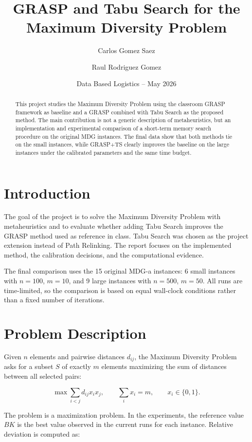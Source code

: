 \documentclass[12pt,a4paper]{article}
\title{\textbf{GRASP and Tabu Search for the Maximum Diversity Problem}}
\author{Carlos Gomez Saez \and Raul Rodriguez Gomez}
\date{Data Based Logistics -- May 2026}
\newcommand{\mdp}{Maximum Diversity Problem}
\newcommand{\grasp}{GRASP}
\newcommand{\graspTS}{GRASP+TS}
\newcommand{\tabu}{Tabu Search}
\begin{document}
\maketitle

\begin{abstract}
This project studies the \mdp{} using the classroom \grasp{} framework as baseline and a \grasp{} combined with \tabu{} as the proposed method. The main contribution is not a generic description of metaheuristics, but an implementation and experimental comparison of a short-term memory search procedure on the original MDG instances. The final data show that both methods tie on the small instances, while \graspTS{} clearly improves the baseline on the large instances under the calibrated parameters and the same time budget.
\end{abstract}

\section{Introduction}

The goal of the project is to solve the \mdp{} with metaheuristics and to evaluate whether adding \tabu{} improves the \grasp{} method used as reference in class. \tabu{} was chosen as the project extension instead of Path Relinking. The report focuses on the implemented method, the calibration decisions, and the computational evidence.

The final comparison uses the 15 original MDG-a instances: 6 small instances with \(n=100\), \(m=10\), and 9 large instances with \(n=500\), \(m=50\). All runs are time-limited, so the comparison is based on equal wall-clock conditions rather than a fixed number of iterations.

\section{Problem Description}

Given \(n\) elements and pairwise distances \(d_{ij}\), the \mdp{} asks for a subset \(S\) of exactly \(m\) elements maximizing the sum of distances between all selected pairs:

\begin{equation}
\max \sum_{i<j} d_{ij} x_i x_j,
\qquad
\sum_i x_i = m,
\qquad
x_i \in \{0,1\}.
\end{equation}

The problem is a maximization problem. In the experiments, the reference value \(BK\) is the best value observed in the current runs for each instance. Relative deviation is computed as:
\end{document}
